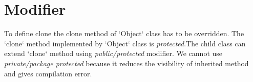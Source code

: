\section{Modifier \label{modifier}}
To define clone the clone method of `Object` class has to be overridden. The `clone` method implemented by `Object` class is \textit{protected}.The child class can extend `clone` method using \textit{public/protected} modifier. We cannot use \textit{private/package protected} because it reduces the visibility of inherited method and gives compilation error. 


%
